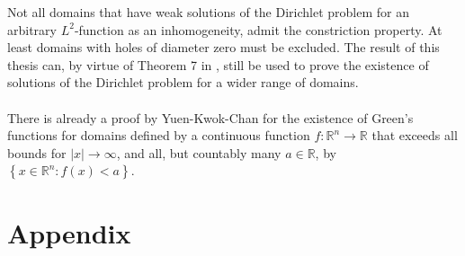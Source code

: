 \documentclass[11pt,a4paper,leqno]{report}
\numberwithin{equation}{chapter}
\begin{document}
Not all domains that have weak solutions of the Dirichlet problem for an arbitrary $L^2$-function as an inhomogeneity, admit the constriction property. At least domains with holes of diameter zero must be excluded. The result of this thesis can, by virtue of Theorem 7 in \cite{SDPC}, still be used to prove the existence of solutions of the Dirichlet problem for a wider range of domains. \\
\\
There is already a proof by Yuen-Kwok-Chan \cite{CPT} for the existence of Green's functions for domains defined by a continuous function $f:\mathbb{R}^n\rightarrow\mathbb{R}$ that exceeds all bounds for $|x|\rightarrow\infty$, and all, but countably many $a\in\mathbb{R}$, by $\left\{x\in\mathbb{R}^n: f(x)<a\right\}$.







\chapter{Appendix}
\end{document}
